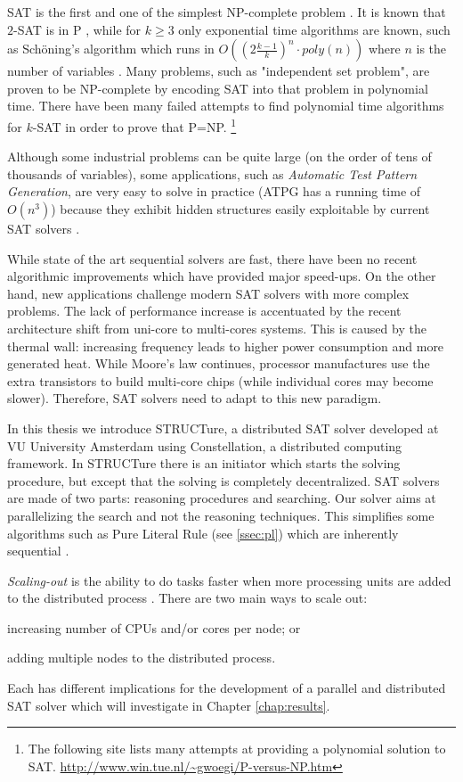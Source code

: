 SAT is the first and one of the simplest NP-complete problem
\cite{Cook:1971:CTP:800157.805047}. It is known that $2$-SAT
is in P \cite{karp}, while for $k \ge 3$ only exponential time
algorithms are known, such as Sch\"{o}ning's algorithm which runs in
$O((2\frac{k - 1}{k})^n \cdot poly(n))$ where $n$ is the number of
variables \cite{Schoning:1999:PAK:795665.796524}.  Many problems,
such as "independent set problem", are proven to be NP-complete
by encoding SAT into that problem in polynomial time.  There have
been many failed attempts to find polynomial time algorithms for
$k$-SAT in order to prove that P=NP.  \footnote{The following
site lists many attempts at providing a polynomial solution to
SAT. \url{http://www.win.tue.nl/~gwoegi/P-versus-NP.htm}}

Although some industrial problems can be quite large (on the order
of tens of thousands of variables), some applications, such
as \emph{Automatic Test Pattern Generation}, are very easy to
solve in practice (ATPG has a running time of $O(n^3)$) because they
exhibit hidden structures easily exploitable by current SAT solvers
\cite{Prasad:1999:WAE:309847.309857}.

While state of the art sequential solvers are fast, there have
been no recent algorithmic improvements which have provided major
speed-ups. On the other hand, new applications challenge modern SAT
solvers with more complex problems.  The lack of performance increase
is accentuated by the recent architecture shift from uni-core to
multi-cores systems. This is caused by the thermal wall: increasing
frequency leads to higher power consumption and more generated
heat. While Moore's law continues, processor manufactures use the
extra transistors to build multi-core chips (while individual cores
may become slower).  Therefore, SAT solvers need to adapt to this
new paradigm.

In this thesis we introduce STRUCTure, a distributed SAT solver
developed at VU University Amsterdam using Constellation, a
distributed computing framework. In STRUCTure there is an initiator
which starts the solving procedure, but except that the solving
is completely decentralized.  SAT solvers are made of two parts:
reasoning procedures and searching.  Our solver aims at parallelizing
the search and not the reasoning techniques.  This simplifies some
algorithms such as Pure Literal Rule (see \ref{ssec:pl}) which are
inherently sequential \cite{Johannsen:2005:CPL:1166822.1166834}.

\emph{Scaling-out} is the ability to do tasks faster when
more processing units are added to the distributed process
\cite{citeulike:1567858}. There are two main ways to scale
out:
\begin{inparaenum}[a)]
  \item increasing number of CPUs and/or cores per node; or
  \item adding multiple nodes to the distributed process.
\end{inparaenum} Each has different implications for the development
of a parallel and distributed SAT solver which will investigate in
Chapter \ref{chap:results}.


